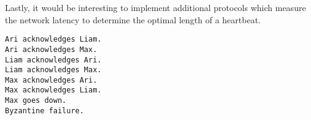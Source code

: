 \documentclass[%
               nonacm,sigconf,10pt]{acmart}
\begin{document}
Lastly, it would be interesting to implement additional protocols which measure the network latency to determine the optimal length of a heartbeat.  

\begin{acks}
\begin{lstlisting}[basicstyle=\ttfamily\small, breaklines=true]
Ari acknowledges Liam.
Ari acknowledges Max.
Liam acknowledges Ari.
Liam acknowledges Max.
Max acknowledges Ari.
Max acknowledges Liam.
Max goes down.
Byzantine failure.
\end{lstlisting}
\end{acks}

\nocite{*}



\end{document}
